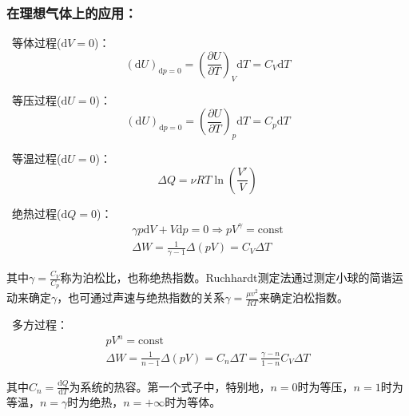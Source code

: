 \documentclass[zihao=-4,UTF8]{report}
\begin{document}
\subsubsection{在理想气体上的应用：}
\ 等体过程($\mathrm{d}V = 0$)：
\begin{equation}
    (\mathrm{d}U)_{\mathrm{d}p = 0}  = \left(\frac{\partial U}{\partial T}\right)_V\mathrm{d}T  = C_V \mathrm{d}T 
\end{equation}
\par
{}\ 等压过程($\mathrm{d}U = 0$)：
\begin{equation}
    (\mathrm{d}U)_{\mathrm{d}p = 0}  = \left(\frac{\partial U}{\partial T}\right)_p\mathrm{d}T  = C_p \mathrm{d}T 
\end{equation}
\par
{}\ 等温过程($\mathrm{d}U = 0$)：
\begin{equation}
    \Delta Q = \nu RT \ln (\frac{V'}{V})
\end{equation}

\par
{}\ 绝热过程($\mathrm{d}Q = 0$)：
\begin{gather}
    \gamma p \mathrm{d}V + V\mathrm{d}p = 0 \Longrightarrow p V^{\gamma} = \text{const}\\
    \Delta W = \frac{1}{\gamma -1}\Delta \left(pV\right) = C_V\Delta T
\end{gather}\par
{\color{gray}\small 其中$\gamma = \frac{C_V}{C_p}$称为泊松比，也称绝热指数。Ruchhardt测定法通过测定小球的简谐运动来确定$\gamma$，也可通过声速与绝热指数的关系$\gamma = \frac{\mu v^2}{RT}$来确定泊松指数。}
\par
{}\ 多方过程：
\begin{gather}
    pV^n = \text{const}\\
    \Delta W = \frac{1}{n-1}\Delta \left(pV\right) = C_n\Delta T = \frac{\gamma-n}{1-n}C_V\Delta T
\end{gather}\par
{\color{gray}\small 其中$C_n = \frac{\mathrm{d} Q}{\mathrm{d} T}$为系统的热容。第一个式子中，特别地，$n=0$时为等压，$n=1$时为等温，$n=\gamma$时为绝热，$n=+\infty$时为等体。}
\par
\end{document}
